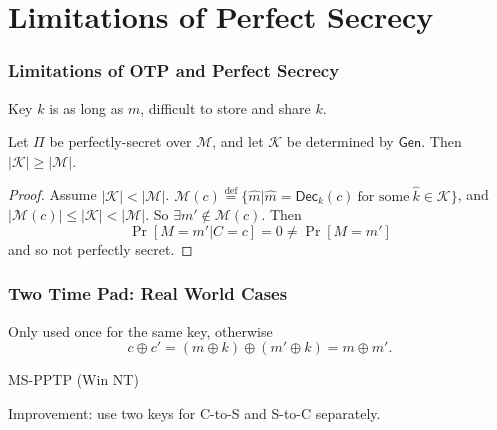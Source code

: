 \section{Limitations of Perfect Secrecy}
\begin{frame}\frametitle{Limitations of OTP and Perfect Secrecy}
Key $k$ is as long as $m$, difficult to store and share $k$.
\begin{theorem}
Let $\Pi$ be perfectly-secret over $\mathcal{M}$, and let $\mathcal{K}$ be determined by $\mathsf{Gen}$. Then $|\mathcal{K}|\ge |\mathcal{M}|$. 
\end{theorem}
\begin{proof}
Assume $|\mathcal{K}| < |\mathcal{M}|$.
$\mathcal{M}(c) \overset{\text{def}}{=} \{ \hat{m} | \hat{m} = \mathsf{Dec}_k(c)\  \text{for some}\ \hat{k} \in \mathcal{K} \}$, and $|\mathcal{M}(c)|\le |\mathcal{K}| < |\mathcal{M}|$. So $\exists m' \notin \mathcal{M}(c)$. Then
\[ \Pr[M=m'|C=c] = 0 \neq \Pr[M = m'] \]
and so not perfectly secret.
\end{proof}
\end{frame}
\begin{frame}\frametitle{Two Time Pad: Real World Cases}
Only used once for the same key, otherwise
\[c\oplus c'=(m\oplus k)\oplus (m'\oplus k)=m\oplus m'.\]
\begin{exampleblock}{MS-PPTP (Win NT)}
\begin{figure}
\begin{center}

\end{center}
\end{figure}
Improvement: use two keys for C-to-S and S-to-C separately.
\end{exampleblock}
\end{frame}
